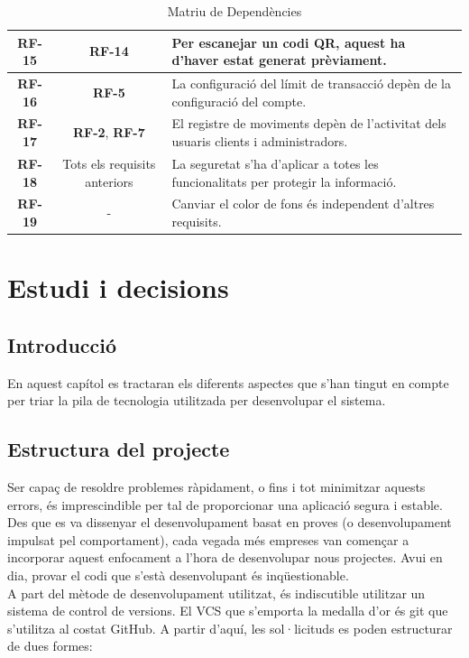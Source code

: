 \documentclass[a4paper,12pt,twoside]{ThesisStyle}
\begin{document}
\begin{table}[h!]
\begin{tabular}{|c|c|p{7cm}|}
    \textbf{RF-15} & \textbf{RF-14} & Per escanejar un codi QR, aquest ha d'haver estat generat prèviament. \\ \hline
    \textbf{RF-16} & \textbf{RF-5} & La configuració del límit de transacció depèn de la configuració del compte. \\ \hline
    \textbf{RF-17} & \textbf{RF-2}, \textbf{RF-7} & El registre de moviments depèn de l'activitat dels usuaris clients i administradors. \\ \hline
    \textbf{RF-18} & Tots els requisits anteriors & La seguretat s'ha d'aplicar a totes les funcionalitats per protegir la informació. \\ \hline
    \textbf{RF-19} & - & Canviar el color de fons és independent d'altres requisits. \\ \hline
    \end{tabular}
    \caption{Matriu de Dependències}
    \label{tab:matriu_dependències}
    \end{table}
    



\chapter{Estudi i decisions}
\label{chp:estudi}


\section{Introducció}
\label{sec:Introducció}

En aquest capítol es tractaran els diferents aspectes que s'han tingut en compte
per triar la pila de tecnologia utilitzada per desenvolupar el sistema.


\section{Estructura del projecte}
\label{sec:Estructura del projecte}

Ser capaç de resoldre problemes ràpidament, o fins i tot minimitzar aquests errors, és imprescindible
per tal de proporcionar una aplicació segura i estable. Des que es va dissenyar el desenvolupament basat en proves (o desenvolupament impulsat pel comportament), cada vegada més empreses van començar a incorporar aquest enfocament a l'hora de desenvolupar nous projectes. Avui en dia, provar el codi que s'està desenvolupant és inqüestionable.\\

A part del mètode de desenvolupament utilitzat, és indiscutible utilitzar un sistema de control de versions. El VCS que s'emporta la medalla d'or és git que s'utilitza al costat
GitHub. A partir d'aquí, les sol·licituds es poden estructurar de dues formes:
\end{document}
